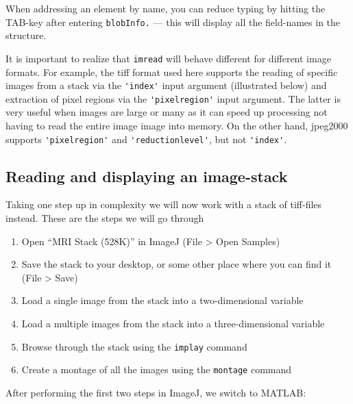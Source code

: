 When addressing an element by name, you can reduce typing by hitting the TAB-key after entering \lstinline{blobInfo.} --- this will display all the field-names in the structure.

It is important to realize that \lstinline{imread} will behave different for different image formats.
For example, the tiff format used here supports the reading of specific images from a stack via the \lstinline{'index'} input argument (illustrated below) and extraction of pixel regions via the \lstinline{'pixelregion'} input argument. The latter is very useful when images are large or many as it can speed up processing not having to read the entire image image into memory.
On the other hand, jpeg2000 supports \lstinline{'pixelregion'} and \lstinline{'reductionlevel'}, but not \lstinline{'index'}.

\subsection{Reading and displaying an image-stack}
Taking one step up in complexity we will now work with a stack of tiff-files instead.
These are the steps we will go through

\begin{enumerate}
\item Open ``MRI Stack (528K)'' in ImageJ (File > Open Samples)
\item Save the stack to your desktop, or some other place where you can find it (File > Save)
\item Load a single image from the stack into a two-dimensional variable
\item Load a multiple images from the stack into a three-dimensional variable
\item Browse through the stack using the \lstinline{implay} command
\item Create a montage of all the images using the \lstinline{montage} command
\end{enumerate}
After performing the first two steps in ImageJ, we switch to MATLAB: